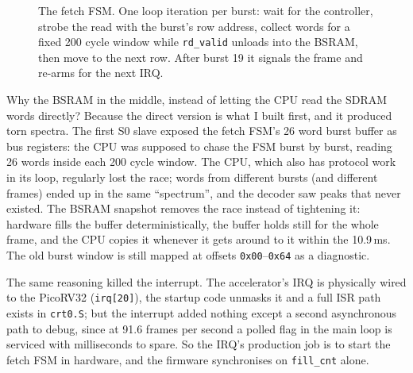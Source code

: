 \documentclass[a4paper,11pt]{article}
\begin{document}
\begin{figure}[H]
\centering
{}
\caption{The fetch FSM. One loop iteration per burst: wait for the controller,
strobe the read with the burst's row address, collect words for a fixed 200 cycle
window while \texttt{rd\_valid} unloads into the BSRAM, then move to the next row.
After burst 19 it signals the frame and re-arms for the next IRQ.}
\label{fig:fetch-fsm}
\end{figure}

Why the BSRAM in the middle, instead of letting the CPU read the SDRAM words
directly? Because the direct version is what I built first, and it produced torn
spectra. The first S0 slave exposed the fetch FSM's 26 word burst buffer as bus
registers: the CPU was supposed to chase the FSM burst by burst, reading 26 words
inside each 200 cycle window. The CPU, which also has protocol work in its loop,
regularly lost the race; words from different bursts (and different frames) ended
up in the same ``spectrum'', and the decoder saw peaks that never existed. The
BSRAM snapshot removes the race instead of tightening it: hardware fills the
buffer deterministically, the buffer holds still for the whole frame, and the CPU
copies it whenever it gets around to it within the 10.9\,ms. The old burst window
is still mapped at offsets \texttt{0x00}--\texttt{0x64} as a diagnostic.

The same reasoning killed the interrupt. The accelerator's IRQ is physically wired
to the PicoRV32 (\texttt{irq[20]}), the startup code unmasks it and a full ISR
path exists in \texttt{crt0.S}; but the interrupt added nothing except a second
asynchronous path to debug, since at 91.6 frames per second a polled flag in the
main loop is serviced with milliseconds to spare. So the IRQ's production job is
to start the fetch FSM in hardware, and the firmware synchronises on
\texttt{fill\_cnt} alone.
\end{document}
